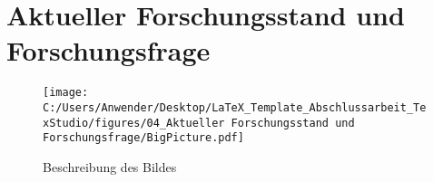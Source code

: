 \chapter{Aktueller Forschungsstand und Forschungsfrage}
\label{ch_04Aktueller Forschungsstand und Forschungsfrage}

\begin{figure}[h]
	\centering
	\texttt{[image: C:/Users/Anwender/Desktop/LaTeX\_Template\_Abschlussarbeit\_TexStudio/figures/04\_Aktueller Forschungsstand und Forschungsfrage/BigPicture.pdf]}
	\caption{Beschreibung des Bildes}
	\label{fig_BigPicture}
\end{figure}









